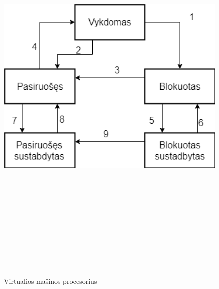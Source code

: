 \documentclass[oneside]{VUMIFPSkursinis}
\begin{document}
\begin{figure}[H]
		\centering	
	\includegraphics[width=18cm,height=20cm,keepaspectratio]{ProcesuBusenos.png}
	\caption{Virtualios mašinos procesorius}
	\label{fig:Virtualios mašinos procesorius}
\end{figure}
\end{document}
